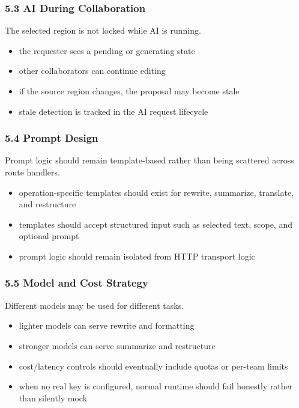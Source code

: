 \documentclass[a4paper]{article}
\providecommand{\tightlist}{%
  \setlength{\itemsep}{0pt}\setlength{\parskip}{0pt}}
\begin{document}
\subsubsection{5.3 AI During
Collaboration}\label{53-ai-during-collaboration}

The selected region is not locked while AI is running.

\begin{itemize}
\tightlist
\item
  the requester sees a pending or generating state
\item
  other collaborators can continue editing
\item
  if the source region changes, the proposal may become stale
\item
  stale detection is tracked in the AI request lifecycle
\end{itemize}

\subsubsection{5.4 Prompt Design}\label{54-prompt-design}

Prompt logic should remain template-based rather than being scattered
across route handlers.

\begin{itemize}
\tightlist
\item
  operation-specific templates should exist for rewrite, summarize,
  translate, and restructure
\item
  templates should accept structured input such as selected text, scope,
  and optional prompt
\item
  prompt logic should remain isolated from HTTP transport logic
\end{itemize}

\subsubsection{5.5 Model and Cost
Strategy}\label{55-model-and-cost-strategy}

Different models may be used for different tasks.

\begin{itemize}
\tightlist
\item
  lighter models can serve rewrite and formatting
\item
  stronger models can serve summarize and restructure
\item
  cost/latency controls should eventually include quotas or per-team
  limits
\item
  when no real key is configured, normal runtime should fail honestly
  rather than silently mock
\end{itemize}
\end{document}
